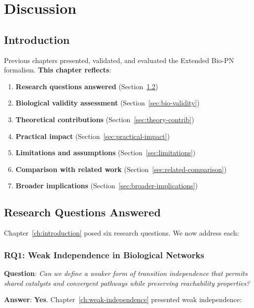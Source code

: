 \chapter{Discussion}
\label{ch:discussion}

\section{Introduction}
\label{sec:discussion-intro}

Previous chapters presented, validated, and evaluated the Extended Bio-PN formalism. \textbf{This chapter reflects}:

\begin{enumerate}
    \item \textbf{Research questions answered} (Section~\ref{sec:rq-answered})
    \item \textbf{Biological validity assessment} (Section~\ref{sec:bio-validity})
    \item \textbf{Theoretical contributions} (Section~\ref{sec:theory-contrib})
    \item \textbf{Practical impact} (Section~\ref{sec:practical-impact})
    \item \textbf{Limitations and assumptions} (Section~\ref{sec:limitations})
    \item \textbf{Comparison with related work} (Section~\ref{sec:related-comparison})
    \item \textbf{Broader implications} (Section~\ref{sec:broader-implications})
\end{enumerate}

\section{Research Questions Answered}
\label{sec:rq-answered}

Chapter~\ref{ch:introduction} posed six research questions. We now address each:

\subsection{RQ1: Weak Independence in Biological Networks}
\label{subsec:rq1}

\textbf{Question}: \textit{Can we define a weaker form of transition independence that permits shared catalysts and convergent pathways while preserving reachability properties?}

\textbf{Answer}: \textbf{Yes}. Chapter~\ref{ch:weak-independence} presented weak independence:

